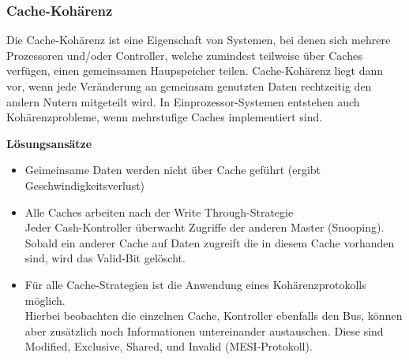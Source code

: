 \subsubsection{Cache-Kohärenz}
Die Cache-Kohärenz ist eine Eigenschaft von Systemen, bei denen sich mehrere Prozessoren und/oder Controller, welche zumindest teilweise über Caches verfügen, einen gemeinsamen Haupspeicher teilen.
Cache-Kohärenz liegt dann vor, wenn jede Veränderung an gemeinsam genutzten Daten rechtzeitig den andern Nutern mitgeteilt wird.
In Einprozessor-Systemen entstehen auch Kohärenzprobleme, wenn mehrstufige Caches implementiert sind.

\textbf{Lösungsansätze}
\begin{itemize}[noitemsep,topsep=0pt]
	\item Geimeinsame Daten werden nicht über Cache geführt (ergibt Geschwindigkeitsverlust)
	\item Alle Caches arbeiten nach der Write Through-Strategie\\
	Jeder Cash-Kontroller überwacht Zugriffe der anderen Master (Snooping). Sobald ein anderer Cache auf Daten zugreift die in diesem Cache vorhanden sind, wird das Valid-Bit gelöscht.
	\item Für alle Cache-Strategien ist die Anwendung eines Kohärenzprotokolls möglich.\\
	Hierbei beobachten die einzelnen Cache, Kontroller ebenfalls den Bus, können aber zusätzlich noch Informationen untereinander austauschen. Diese sind Modified, Exclusive, Shared, und Invalid (MESI-Protokoll).
\end{itemize}
